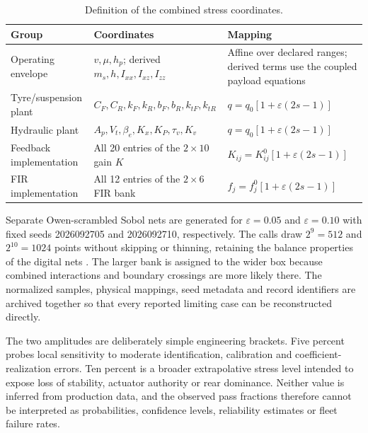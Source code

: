 \documentclass[10pt,a4paper]{article}
\newcommand{\robustnew}[1]{#1}
\begin{document}
\begin{table}[htbp]
\centering\small
\caption{Definition of the combined stress coordinates.}
\label{tab:supp-combined-uncertainty}
\begin{tabular}{p{.22\linewidth}p{.49\linewidth}p{.20\linewidth}}
\toprule
Group & Coordinates & Mapping\\
\midrule
Operating envelope & $v,\mu,h_p$; derived $m_s,h,I_{xx},I_{xz},I_{zz}$ & Affine over declared ranges; derived terms use the coupled payload equations\\
Tyre/suspension plant & $C_F,C_R,k_F,k_R,b_F,b_R,k_{tF},k_{tR}$ & $q=q_0[1+\varepsilon(2s-1)]$\\
Hydraulic plant & $A_p,V_t,\beta_e,K_x,K_P,\tau_v,K_v$ & $q=q_0[1+\varepsilon(2s-1)]$\\
Feedback implementation & All 20 entries of the $2\times10$ gain $K$ & $K_{ij}=K_{ij}^0[1+\varepsilon(2s-1)]$\\
FIR implementation & All 12 entries of the $2\times6$ FIR bank & $f_j=f_j^0[1+\varepsilon(2s-1)]$\\
\bottomrule
\end{tabular}
\end{table}

\robustnew{Separate Owen-scrambled Sobol nets are generated for $\varepsilon=0.05$ and $\varepsilon=0.10$ with fixed seeds 2026092705 and 2026092710, respectively. The calls draw $2^9=512$ and $2^{10}=1024$ points without skipping or thinning, retaining the balance properties of the digital nets \cite{sobol1967,owen1998}. The larger bank is assigned to the wider box because combined interactions and boundary crossings are more likely there. The normalized samples, physical mappings, seed metadata and record identifiers are archived together so that every reported limiting case can be reconstructed directly.}

\robustnew{The two amplitudes are deliberately simple engineering brackets. Five percent probes local sensitivity to moderate identification, calibration and coefficient-realization errors. Ten percent is a broader extrapolative stress level intended to expose loss of stability, actuator authority or rear dominance. Neither value is inferred from production data, and the observed pass fractions therefore cannot be interpreted as probabilities, confidence levels, reliability estimates or fleet failure rates.}
\end{document}
